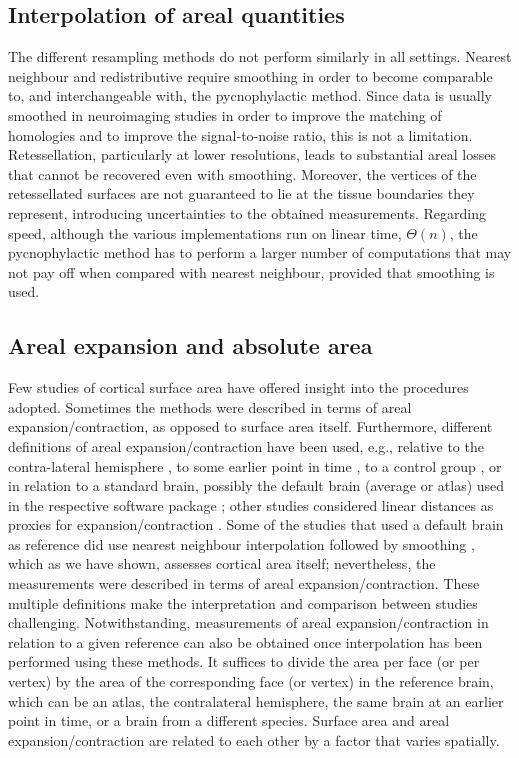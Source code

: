 \subsection{Interpolation of areal quantities}

The different resampling methods do not perform similarly in all settings. Nearest neighbour and redistributive require smoothing in order to become comparable to, and interchangeable with, the pycnophylactic method. Since data is usually smoothed in neuroimaging studies in order to improve the matching of homologies and to improve the signal-to-noise ratio, this is not a limitation. Retessellation, particularly at lower resolutions, leads to substantial areal losses that cannot be recovered even with smoothing. Moreover, the vertices of the retessellated surfaces are not guaranteed to lie at the tissue boundaries they represent, introducing uncertainties to the obtained measurements. Regarding speed, although the various implementations run on linear time, $\Theta(n)$, the pycnophylactic method has to perform a larger number of computations that may not pay off when compared with nearest neighbour, provided that smoothing is used.

\subsection{Areal expansion and absolute area}

Few studies of cortical surface area have offered insight into the procedures adopted. Sometimes the methods were described in terms of areal expansion/contraction, as opposed to surface area itself. Furthermore, different definitions of areal expansion/contraction have been used, e.g., relative to the contra-lateral hemisphere \citep{Lyttelton2009}, to some earlier point in time \citep{Hill2010}, to a control group \citep{Palaniyappan2011}, or in relation to a standard brain, possibly the default brain (average or atlas) used in the respective software package \citep{Joyner2009, Rimol2010_pnas, Rimol2012, Chen2011, Chen2012, Vuoksimaa2016}; other studies considered linear distances as proxies for expansion/contraction \citep{Sun2009_sr, Sun2009_mp}. Some of the studies that used a default brain as reference did use nearest neighbour interpolation followed by smoothing \citep{Joyner2009, Rimol2010_pnas, Rimol2012}, which as we have shown, assesses cortical area itself; nevertheless, the measurements were described in terms of areal expansion/contraction. These multiple definitions make the interpretation and comparison between studies challenging. Notwithstanding, measurements of areal expansion/contraction in relation to a given reference can also be obtained once interpolation has been performed using these methods. It suffices to divide the area per face (or per vertex) by the area of the corresponding face (or vertex) in the reference brain, which can be an atlas, the contralateral hemisphere, the same brain at an earlier point in time, or a brain from a different species. Surface area and areal expansion/contraction are related to each other by a factor that varies spatially.

